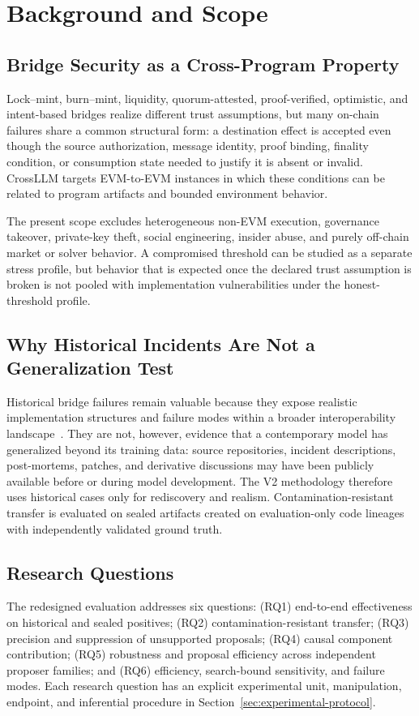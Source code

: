 \documentclass[journal]{IEEEtran}
\theoremstyle{definition}
\begin{document}
\section{Background and Scope}
\label{sec:background}

\subsection{Bridge Security as a Cross-Program Property}
Lock--mint, burn--mint, liquidity, quorum-attested, proof-verified, optimistic, and intent-based bridges realize different trust assumptions, but many on-chain failures share a common structural form: a destination effect is accepted even though the source authorization, message identity, proof binding, finality condition, or consumption state needed to justify it is absent or invalid. CrossLLM targets EVM-to-EVM instances in which these conditions can be related to program artifacts and bounded environment behavior.

The present scope excludes heterogeneous non-EVM execution, governance takeover, private-key theft, social engineering, insider abuse, and purely off-chain market or solver behavior. A compromised threshold can be studied as a separate stress profile, but behavior that is expected once the declared trust assumption is broken is not pooled with implementation vulnerabilities under the honest-threshold profile.

\subsection{Why Historical Incidents Are Not a Generalization Test}
Historical bridge failures remain valuable because they expose realistic implementation structures and failure modes within a broader interoperability landscape~\cite{belchior2021survey,zamyatin2021sok}. They are not, however, evidence that a contemporary model has generalized beyond its training data: source repositories, incident descriptions, post-mortems, patches, and derivative discussions may have been publicly available before or during model development. The V2 methodology therefore uses historical cases only for rediscovery and realism. Contamination-resistant transfer is evaluated on sealed artifacts created on evaluation-only code lineages with independently validated ground truth.

\subsection{Research Questions}
The redesigned evaluation addresses six questions: (RQ1) end-to-end effectiveness on historical and sealed positives; (RQ2) contamination-resistant transfer; (RQ3) precision and suppression of unsupported proposals; (RQ4) causal component contribution; (RQ5) robustness and proposal efficiency across independent proposer families; and (RQ6) efficiency, search-bound sensitivity, and failure modes. Each research question has an explicit experimental unit, manipulation, endpoint, and inferential procedure in Section~\ref{sec:experimental-protocol}.
\end{document}

